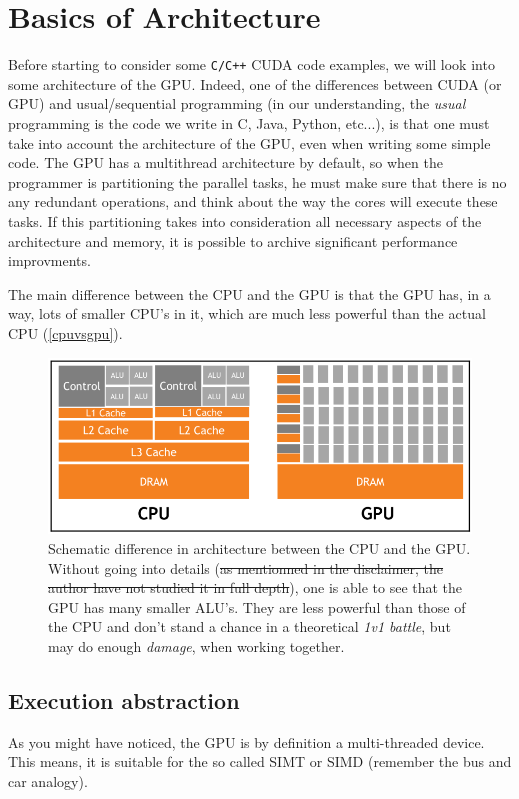 
\section{Basics of Architecture}

Before starting to consider some \verb|C/C++| CUDA code examples, we will look into some architecture of the GPU. 
Indeed, one of the differences between CUDA (or GPU) and usual/sequential programming (in our understanding, the
\textit{usual} programming is the code we write in C, Java, Python, etc...), 
is that one must take into account
the architecture of the GPU, even when writing some simple code. The GPU has a multithread architecture by default, 
so when the programmer is partitioning the parallel tasks, he must make sure that there is no any redundant
operations, and think about the way the cores will execute these tasks. If this partitioning takes into consideration all necessary aspects of the architecture and memory, it is possible to archive significant performance improvments.


The main difference between the CPU and the GPU is that the GPU has, in a way, lots of smaller CPU's in it, which 
are much less powerful than the actual CPU (\autoref{cpuvsgpu}).
\cite{tuomanen2018hands}

\begin{figure}
   \centering
   \includegraphics[scale=0.4]{pngs/cpuvsgpu.png}
   \caption{Schematic difference in architecture between the CPU and the GPU. Without going into details 
   (\sout{as mentionned in the disclaimer, the author have not studied it in full depth}), one is able to see that 
   the GPU has many smaller ALU's. They are less powerful than those of the CPU and don't stand a chance in 
    a theoretical \textit{1v1 battle}, but may do enough \textit{damage}, when working together.\cite{tuomanen2018hands}}
   \label{cpuvsgpu}
\end{figure}

\subsection{Execution abstraction}
As you might have noticed, the GPU is by definition a multi-threaded device. This means, it is suitable for the so called 
SIMT or SIMD (remember the bus and car analogy).


